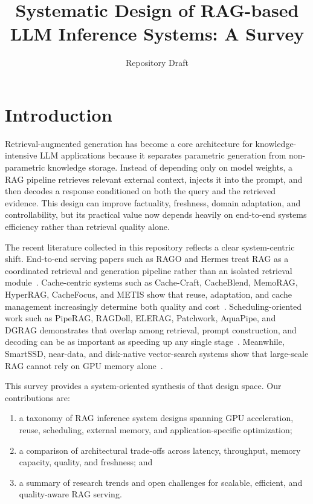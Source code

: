 \documentclass[acmsmall,screen]{acmart}
\title{Systematic Design of RAG-based LLM Inference Systems: A Survey}
\author{Repository Draft}
\affiliation{%
  \institution{Awesome-RAG-LLM-Inference-System Repository}
  \city{Online}
  \country{GitHub}
}
\begin{document}
\maketitle

\section{Introduction}

Retrieval-augmented generation has become a core architecture for knowledge-intensive LLM applications because it separates parametric generation from non-parametric knowledge storage. Instead of depending only on model weights, a RAG pipeline retrieves relevant external context, injects it into the prompt, and then decodes a response conditioned on both the query and the retrieved evidence. This design can improve factuality, freshness, domain adaptation, and controllability, but its practical value now depends heavily on end-to-end systems efficiency rather than retrieval quality alone.

The recent literature collected in this repository reflects a clear system-centric shift. End-to-end serving papers such as RAGO and Hermes treat RAG as a coordinated retrieval and generation pipeline rather than an isolated retrieval module~\cite{rago2025,hermes2025}. Cache-centric systems such as Cache-Craft, CacheBlend, MemoRAG, HyperRAG, CacheFocus, and METIS show that reuse, adaptation, and cache management increasingly determine both quality and cost~\cite{cachecraft2025,cacheblend2025,memorag2025,hyperrag2025,cachefocus2025,metis2025}. Scheduling-oriented work such as PipeRAG, RAGDoll, ELERAG, Patchwork, AquaPipe, and DGRAG demonstrates that overlap among retrieval, prompt construction, and decoding can be as important as speeding up any single stage~\cite{piperag2025,ragdoll2025,elerag2025,patchwork2025,aquapipe2025,dgrag2025}. Meanwhile, SmartSSD, near-data, and disk-native vector-search systems show that large-scale RAG cannot rely on GPU memory alone~\cite{smartssd2024,ndsearch2024,chameleon2025,diskann2019,lmdiskann2023,lsmvec2025}.

This survey provides a system-oriented synthesis of that design space. Our contributions are:
\begin{enumerate}[leftmargin=*]
  \item a taxonomy of RAG inference system designs spanning GPU acceleration, reuse, scheduling, external memory, and application-specific optimization;
  \item a comparison of architectural trade-offs across latency, throughput, memory capacity, quality, and freshness; and
  \item a summary of research trends and open challenges for scalable, efficient, and quality-aware RAG serving.
\end{enumerate}
\end{document}
